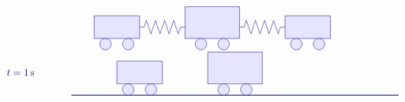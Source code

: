 \begin{solution}
\begin{itemize}
\begin{equation*}
\begin{tikzpicture}[scale=0.8, color=blue!50!black]
\begin{scope}[yshift=0cm]
          \begin{scope}[xshift=-1cm]
            \draw[fill=blue!10] (2,0.5) rectangle (4,1.5);
            \draw[fill=blue!10] (2.5,0.25) circle (0.25);
            \draw[fill=blue!10] (3.5,0.25) circle (0.25);
          \end{scope}
          \begin{scope}[xshift=3.2cm]
            \draw[fill=blue!10] (1.8,0.5) rectangle (4.2,1.9);
            \draw[fill=blue!10] (2.5,0.25) circle (0.25);
            \draw[fill=blue!10] (3.5,0.25) circle (0.25);
          \end{scope}
          \begin{scope}[xshift=7.4cm]
            \draw[fill=blue!10] (2,0.5) rectangle (4,1.5);
            \draw[fill=blue!10] (2.5,0.25) circle (0.25);
            \draw[fill=blue!10] (3.5,0.25) circle (0.25);
          \end{scope}
          \begin{scope}[xshift=3cm]
            \draw (0,1) -- ++(0.2,0) -- ++(0.1,0.3)
            -- ++(0.2,-0.6) -- ++(0.2,0.6)
            -- ++(0.2,-0.6) -- ++(0.2,0.6)
            -- ++(0.2,-0.6) -- ++(0.2,0.6)
            -- ++(0.2,-0.6) -- ++(0.1,0.3)
            -- ++(0.2,0);
          \end{scope}
          \begin{scope}[xshift=7.4cm]
            \draw (0,1) -- ++(0.2,0) -- ++(0.1,0.3)
            -- ++(0.2,-0.6) -- ++(0.2,0.6)
            -- ++(0.2,-0.6) -- ++(0.2,0.6)
            -- ++(0.2,-0.6) -- ++(0.2,0.6)
            -- ++(0.2,-0.6) -- ++(0.1,0.3)
            -- ++(0.2,0);
          \end{scope}
        \end{scope}
        \begin{scope}[yshift=-2cm]
          \draw (-3,1) node[right] {$t=1\s$};
          \draw[thick] (0,0) -- (14.4,0);
          \begin{scope}[xshift=0cm]
            \draw[fill=blue!10] (2,0.5) rectangle (4,1.5);
            \draw[fill=blue!10] (2.5,0.25) circle (0.25);
            \draw[fill=blue!10] (3.5,0.25) circle (0.25);
          \end{scope}
          \begin{scope}[xshift=4.2cm]
            \draw[fill=blue!10] (1.8,0.5) rectangle (4.2,1.9);
            \draw[fill=blue!10] (2.5,0.25) circle (0.25);
            \draw[fill=blue!10] (3.5,0.25) circle (0.25);
          \end{scope}
          \begin{scope}[xshift=8.4cm]

\end{scope}
\end{scope}
\end{tikzpicture}
\end{equation*}
\end{itemize}
\end{solution}
